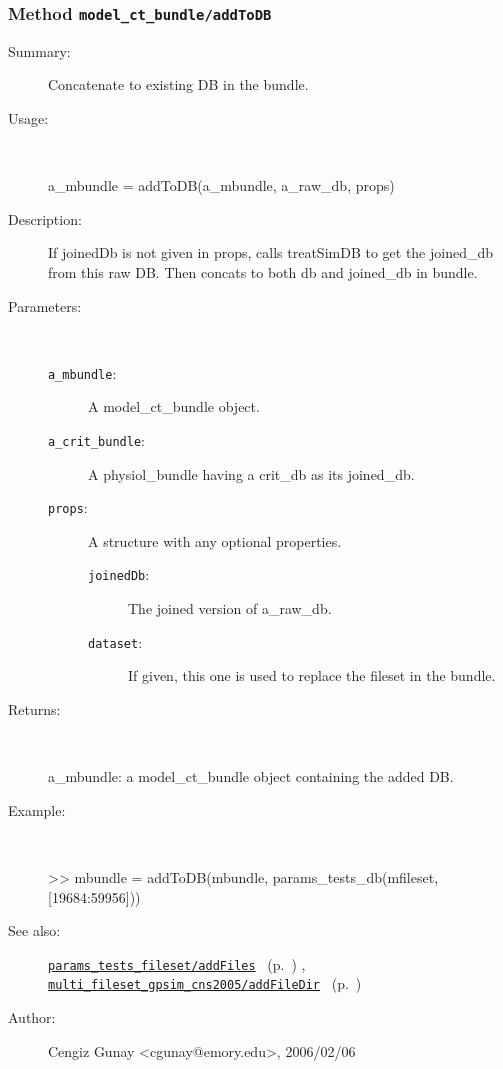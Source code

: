 \subsubsection[Method \texttt{addToDB}]{Method \texttt{model\_ct\_bundle/addToDB}}%
%
\label{ref_model_ct_bundle__addToDB}%
\hypertarget{ref_model_ct_bundle__addToDB}{}%
\begin{description}
\item[Summary:]Concatenate to existing DB in the bundle.
%
\item[Usage:]~%
\begin{lyxcode}%
a\_mbundle = addToDB(a\_mbundle, a\_raw\_db, props)
%
\end{lyxcode}%
%
\item[Description:]%
If joinedDb is not given in props, calls treatSimDB to get the joined\_db from this raw DB. 
 Then concats to both db and joined\_db in bundle.
\item[Parameters:]~
\begin{description}%
\item[\texttt{a\_mbundle}:]
 A model\_ct\_bundle object.
\item[\texttt{a\_crit\_bundle}:]
 A physiol\_bundle having a crit\_db as its joined\_db.
\item[\texttt{props}:]
 A structure with any optional properties.
\begin{description}%
\item[\texttt{joinedDb}:]
 The joined version of a\_raw\_db.
\item[\texttt{dataset}:]
 If given, this one is used to replace the fileset in the bundle.
\end{description}%
\end{description}%
%
\item[Returns:]~

	a\_mbundle: a model\_ct\_bundle object containing the added DB.
%
\item[Example:]~
\begin{lyxcode} >> mbundle = addToDB(mbundle, params\_tests\_db(mfileset, [19684:59956]))\\%
\end{lyxcode}
%
\item[See also:]%
\hyperlink{ref_params_tests_fileset__addFiles}{\texttt{params\_tests\_fileset/addFiles}}%
\ (p.~\pageref{ref_params_tests_fileset__addFiles})%
%
, \hyperlink{ref_multi_fileset_gpsim_cns2005__addFileDir}{\texttt{multi\_fileset\_gpsim\_cns2005/addFileDir}}%
\ (p.~\pageref{ref_multi_fileset_gpsim_cns2005__addFileDir})%
%
%
\item[Author:]%
Cengiz Gunay <cgunay@emory.edu>, 2006/02/06%
\end{description}
\methodline%
